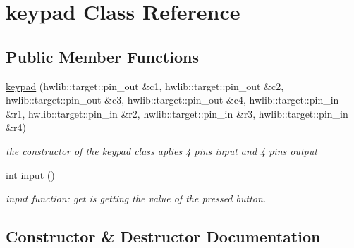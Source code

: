 \hypertarget{classkeypad}{}\section{keypad Class Reference}
\label{classkeypad}
\subsection*{Public Member Functions}
\begin{DoxyCompactItemize}
\item 
\hyperlink{classkeypad_a6e342bf7c51143f25a84db9e0992039b}{keypad} (hwlib\+::target\+::pin\+\_\+out \&c1, hwlib\+::target\+::pin\+\_\+out \&c2, hwlib\+::target\+::pin\+\_\+out \&c3, hwlib\+::target\+::pin\+\_\+out \&c4, hwlib\+::target\+::pin\+\_\+in \&r1, hwlib\+::target\+::pin\+\_\+in \&r2, hwlib\+::target\+::pin\+\_\+in \&r3, hwlib\+::target\+::pin\+\_\+in \&r4)
\begin{DoxyCompactList}\small\item\em the constructor of the keypad class aplies 4 pins input and 4 pins output \end{DoxyCompactList}\item 
int \hyperlink{classkeypad_a2a1334d93f32abfe59930a35b61bdbba}{input} ()
\begin{DoxyCompactList}\small\item\em input function\+: get is getting the value of the pressed button. \end{DoxyCompactList}\end{DoxyCompactItemize}


\subsection{Constructor \& Destructor Documentation}
